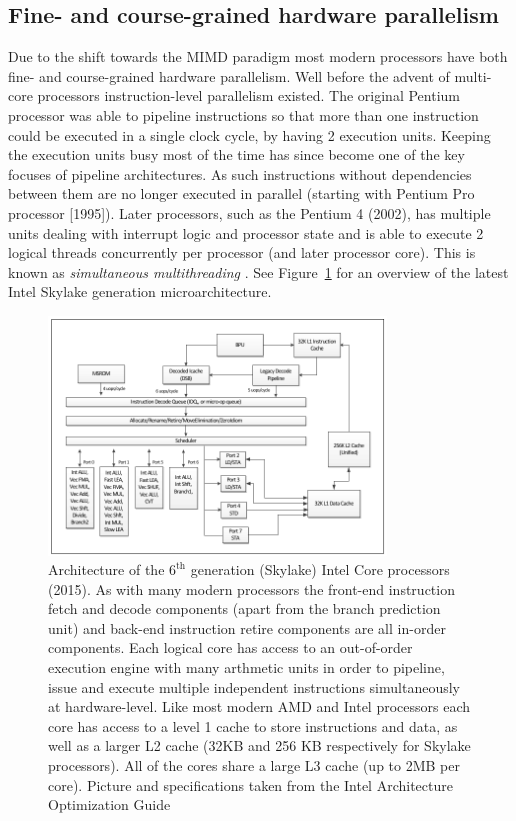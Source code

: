 \subsection{Fine- and course-grained hardware parallelism}
Due to the shift towards the MIMD paradigm most modern processors have both fine- and course-grained hardware parallelism. Well before the advent of multi-core processors instruction-level parallelism
existed. The original Pentium processor was able to pipeline instructions so that more than one instruction could be executed in a single clock cycle, by having 2 execution units. Keeping the execution units
busy most of the time has since become one of the key focuses of pipeline architectures. As such instructions without dependencies between them are no longer executed in parallel (starting with Pentium 
Pro processor [1995]). Later processors, such as the Pentium 4 (2002), has multiple units dealing with interrupt logic and processor state and is able to execute 2 logical threads concurrently per 
processor (and later processor core). This is known as \textit{simultaneous multithreading} \cite{gerber2002software,akhter2006multi}. See Figure~\ref{fig_cpu_arch_skylake} for an overview of the latest 
Intel Skylake generation microarchitecture.
\begin{figure}[ht!]
 \begin{mdframed}
  \centering
  \includegraphics[width=0.8\textwidth]{images/cpu_intel_skylake.png}
  \caption[Intel Skylake Generation Architecture]{Architecture of the $6^\text{th}$ generation (Skylake) Intel Core processors (2015). As with many modern processors the front-end instruction fetch and decode components (apart from 
  the branch prediction unit) and back-end instruction retire components are all in-order components. Each logical core has access to an out-of-order execution engine with many arthmetic units in order to pipeline, issue and 
  execute multiple independent instructions simultaneously at hardware-level. Like most modern AMD and Intel processors each core has access to a level 1 cache to store instructions and data, as well as a larger L2 
  cache (32KB and 256 KB respectively for Skylake processors). All of the cores share a large L3 cache (up to 2MB per core). Picture and specifications taken from the Intel Architecture Optimization Guide \cite{intelArch}}
  \label{fig_cpu_arch_skylake}
 \end{mdframed}
\end{figure}

